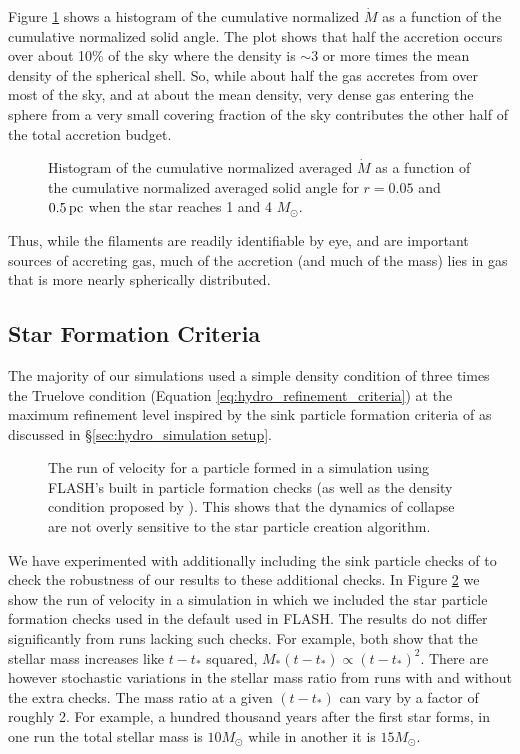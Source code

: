 \documentclass[../dissertation.tex]{subfiles}
\begin{document}
Figure 
\ref{fig:hydro_Accretion_angle_avg} shows a histogram of the cumulative normalized 
$\dot{M}$ as a function of the cumulative normalized solid angle.  
The plot shows that half the accretion occurs over about 10\% of the sky 
where the density is $\sim3$ or more times the mean density of the spherical shell.  
So, while about half the gas accretes from over most of the sky, and at about the mean density,
very dense gas entering the sphere from a very small covering fraction of the sky contributes the other half of the total accretion budget. 
%
\begin{figure}[htb]%
\caption[Hydro Non-filamentary accretion]{Histogram of the cumulative normalized averaged $\dot{M}$ as a function of the cumulative normalized averaged solid angle for $r=0.05$ and $0.5\,\rm pc$ when the star reaches 1 and 4 
$M_{\odot}$. \label{fig:hydro_Accretion_angle_avg}}
\end{figure}

Thus, while the filaments are readily identifiable by eye, and are important sources 
of accreting gas, much of the accretion (and much of the mass) lies in gas that 
is more nearly spherically distributed. 

\subsection{Star Formation Criteria}
\label{particle_criteria}
The majority of our simulations used a simple density condition of three times the Truelove condition (Equation \ref{eq:hydro_refinement_criteria}) at the maximum refinement level inspired by the sink particle formation criteria of \citet{2011ApJ...730...40P} as discussed in \S \ref{sec:hydro_simulation setup}.
%
%
\begin{figure}[htb]%
\caption[Hydro comparison to particle formation checks]{The run of velocity for a particle formed in a simulation using FLASH's built in particle formation checks (as well as the density condition proposed by \citet{2011ApJ...730...40P}). 
This shows that the dynamics of collapse are not overly sensitive to the star particle creation algorithm. \label{fig:hydro_federrath_particle}}
\end{figure}
%
We have experimented with additionally including the sink particle checks of \citet{2010ApJ...713..269F} to check the robustness of our results to these additional checks. In Figure \ref{fig:hydro_federrath_particle} we show the run of velocity in a simulation in which we included the star particle formation checks used in the default used in FLASH. The results do not differ significantly from runs lacking such checks. For example, both show that the stellar mass increases like $t-t_*$ squared, $M_*(t-t_*) \propto (t-t_*)^2$. There are however stochastic variations in the stellar mass ratio from runs with and without the extra checks. The mass ratio at a given $(t-t_*)$ can vary by a factor of roughly 2. For example, a hundred thousand years after the first star forms, in one run the total stellar mass is $10 M_\odot$ while in another it is $15 M_\odot$.
%
\end{document}
